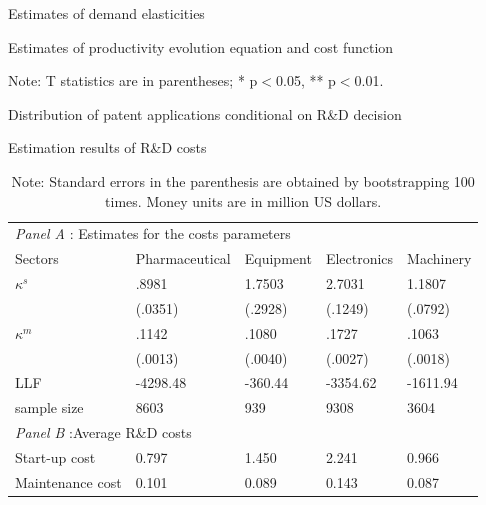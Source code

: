 \documentclass[English]{article}
\begin{document}
\begin{table}[H]
\centering
\caption{Estimates of demand elasticities}
\label{T11}

\end{table}

\begin{table}[H]
\centering
\caption{Estimates of productivity evolution equation and cost function}
\label{T12}

\caption*{\small{}Note: T statistics are in parentheses; {*} p$<$0.05, {*}{*}
p$<$0.01. }{\small \par}
\end{table}

\begin{table}[H]
\centering
\caption{Distribution of patent applications conditional on R\&D decision}
\label{T10}

\end{table}

\begin{table}[H]
\centering
\caption{Estimation results of R\&D costs}
\label{T13}
\begin{tabular}{lllll}
\hline\hline
\multicolumn{5}{l}{{\it Panel A }: Estimates for the costs parameters} \\
Sectors & Pharmaceutical & Equipment & Electronics & Machinery \\
\hline
$\kappa^{s}$      & .8981   & 1.7503  & 2.7031   & 1.1807   \\
            & (.0351)   & (.2928)  & (.1249)  & (.0792)  \\
$\kappa ^{m}$     & .1142   & .1080  & .1727   & .1063   \\
            & (.0013)   & (.0040)  & (.0027)   & (.0018)   \\
\hline
LLF         & -4298.48 & -360.44 & -3354.62 & -1611.94 \\
sample size & 8603     & 939     & 9308     & 3604   \\ 
\hline
\multicolumn{5}{l}{{\it Panel B }:Average R\&D costs} \\
Start-up cost                         &0.797 & 1.450 & 2.241 & 0.966 \\
Maintenance cost                       &0.101 & 0.089 & 0.143 & 0.087\\
\hline\hline 
\end{tabular}
\caption*{\small{}Note: Standard errors in the parenthesis are obtained by bootstrapping 100 times. Money units are in million US dollars.}{\small \par}
\end{table}
\end{document}
